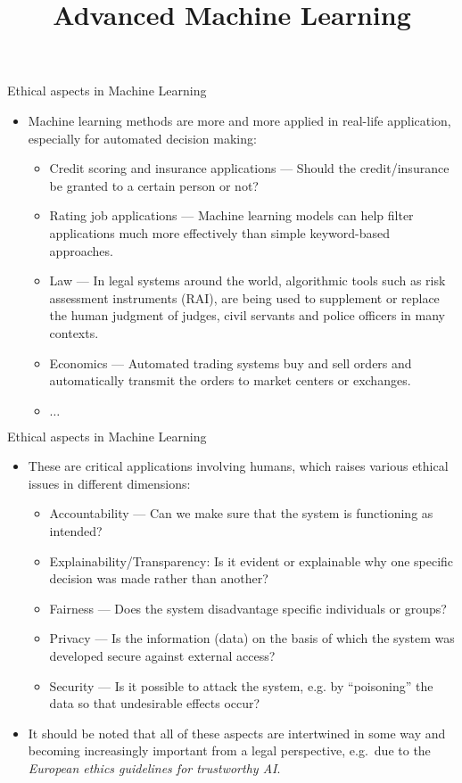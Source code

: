 \documentclass[11pt,compress,t,notes=noshow, xcolor=table]{beamer}
\title{Advanced Machine Learning}
\date{}
\begin{document}



\sloppy

\begin{vbframe}{Ethical aspects in Machine Learning}
%
  \begin{itemize}
%  	
    \item Machine learning methods are more and more applied in real-life application, especially for automated decision making:
%
    \begin{itemize}
%    	
		\item Credit scoring and insurance applications --- Should the credit/insurance be granted to a certain person or not?
%		
		\item Rating job applications --- Machine learning models can help filter applications much more effectively than simple keyword-based approaches.
%		
		\item Law ---  In legal systems around the world, algorithmic tools such as risk assessment instruments (RAI), are being used to supplement or replace the human judgment of judges, civil servants and police officers in many contexts. 
%		
		\item Economics --- Automated trading systems buy and sell orders and automatically transmit the orders to market centers or exchanges. 
%		
		\item $\ldots$
%    	
    \end{itemize}
%
  \end{itemize}
%
\end{vbframe}

\begin{vbframe}{Ethical aspects in Machine Learning}
%	
	\begin{itemize}
%		
		\item These are critical applications involving humans, which raises various ethical issues in different dimensions:
%		
		\begin{itemize}
			\item Accountability --- Can we make sure that the system is functioning as intended?
%			
			\item Explainability/Transparency: Is it evident or explainable why one specific decision was made rather than another?
%			
			\item Fairness --- Does the system disadvantage specific individuals or groups?
%			
			\item Privacy --- Is the information (data) on the basis of which the system was developed secure against external access?
%			
			\item Security --- Is it possible to attack the system, e.g. by ``poisoning'' the data so that undesirable effects occur?
		\end{itemize}
%	
	\item It should be noted that all of these aspects are intertwined in some way and becoming increasingly important from a legal perspective, e.g.\ due to the \emph{European ethics guidelines for trustworthy AI}.
%
	\end{itemize}
%
\end{vbframe}
\end{document}
